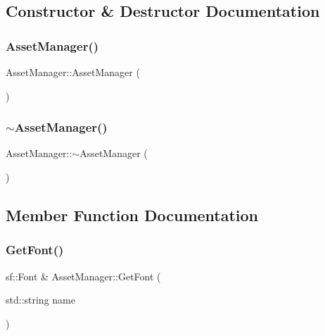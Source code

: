 \subsection{Constructor \& Destructor Documentation}
\mbox{\label{classAssetManager_a750ae7b39b633fbb6594443aa3ca704b}} 
\subsubsection{\texorpdfstring{Asset\+Manager()}{AssetManager()}}
{\footnotesize\ttfamily Asset\+Manager\+::\+Asset\+Manager (\begin{DoxyParamCaption}{ }\end{DoxyParamCaption})}

\mbox{\label{classAssetManager_a9c89817cbf3516f1451c116e89f47d30}} 
\subsubsection{\texorpdfstring{$\sim$\+Asset\+Manager()}{~AssetManager()}}
{\footnotesize\ttfamily Asset\+Manager\+::$\sim$\+Asset\+Manager (\begin{DoxyParamCaption}{ }\end{DoxyParamCaption})}



\subsection{Member Function Documentation}
\mbox{\label{classAssetManager_ac098205eb77fec60842b439215bf4c4f}} 
\subsubsection{\texorpdfstring{Get\+Font()}{GetFont()}}
{\footnotesize\ttfamily sf\+::\+Font \& Asset\+Manager\+::\+Get\+Font (\begin{DoxyParamCaption}\item[{std\+::string}]{name }\end{DoxyParamCaption})}

